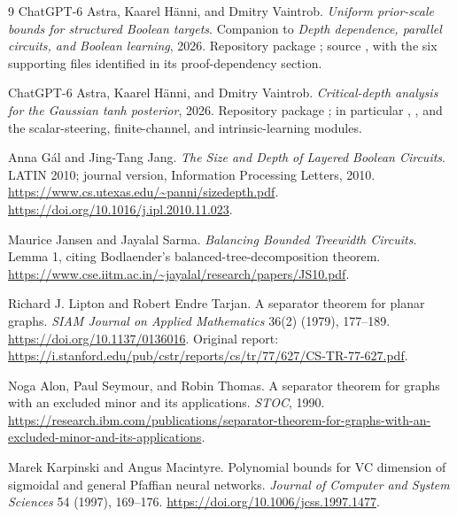 \documentclass[11pt]{article}
\theoremstyle{remark}\newtheorem{remark}[theorem]{Remark}
\begin{document}
\begin{thebibliography}{9}
 ChatGPT-6 Astra, Kaarel H\"anni, and Dmitry Vaintrob.
\emph{Uniform prior-scale bounds for structured Boolean targets}.
Companion to \emph{Depth dependence, parallel circuits, and Boolean
learning}, 2026. Repository package
; source
, with the six supporting
 files identified in its proof-dependency section.

 ChatGPT-6 Astra, Kaarel H\"anni, and Dmitry Vaintrob.
\emph{Critical-depth analysis for the Gaussian tanh posterior}, 2026.
Repository package ; in
particular ,
, and the
scalar-steering, finite-channel, and intrinsic-learning modules.

 Anna G\'al and Jing-Tang Jang.
\emph{The Size and Depth of Layered Boolean Circuits}.
LATIN 2010; journal version, Information Processing Letters, 2010.
\url{https://www.cs.utexas.edu/~panni/sizedepth.pdf}.
\url{https://doi.org/10.1016/j.ipl.2010.11.023}.

 Maurice Jansen and Jayalal Sarma.
\emph{Balancing Bounded Treewidth Circuits}. Lemma 1, citing
Bodlaender's balanced-tree-decomposition theorem.
\url{https://www.cse.iitm.ac.in/~jayalal/research/papers/JS10.pdf}.

 Richard J. Lipton and Robert Endre Tarjan.
A separator theorem for planar graphs.
\emph{SIAM Journal on Applied Mathematics} 36(2) (1979), 177--189.
\url{https://doi.org/10.1137/0136016}.
Original report:
\url{https://i.stanford.edu/pub/cstr/reports/cs/tr/77/627/CS-TR-77-627.pdf}.

 Noga Alon, Paul Seymour, and Robin Thomas.
A separator theorem for graphs with an excluded minor and its applications.
\emph{STOC}, 1990.
\url{https://research.ibm.com/publications/separator-theorem-for-graphs-with-an-excluded-minor-and-its-applications}.

 Marek Karpinski and Angus Macintyre.
Polynomial bounds for VC dimension of sigmoidal and general
Pfaffian neural networks. \emph{Journal of Computer and System
Sciences} 54 (1997), 169--176.
\url{https://doi.org/10.1006/jcss.1997.1477}.
\end{thebibliography}
\end{document}

